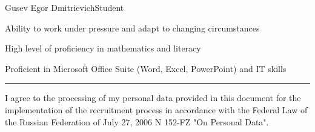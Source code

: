 \documentclass{article}
\begin{document}
\begin{cv}[avatar]{Gusev Egor Dmitrievich}{Student}
\cvseparator
\begin{cvitem}
    Ability to work under pressure and adapt to changing circumstances
\end{cvitem}

\cvseparator
\begin{cvitem}
    High level of proficiency in mathematics and literacy
\end{cvitem}

\cvseparator
\begin{cvitem}
    Proficient in Microsoft Office Suite (Word, Excel, PowerPoint) and IT skills
\end{cvitem}


\end{cv}

\vfill %
\hrule %
\begin{center} %
\tiny %
I agree to the processing of my personal data provided in this document for the implementation of the recruitment process in accordance with the Federal Law of the Russian Federation of July 27, 2006 N 152-FZ "On Personal Data".
\end{center} %
\end{document}
